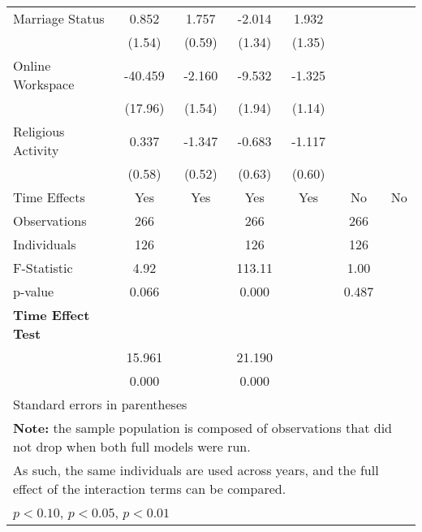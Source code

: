\begin{table}[htbp]
\begin{tabular}{l*{6}{c}}
\hspace{0.25cm} Marriage Status&0.852        &1.757\sym{**}&-2.014        &1.932        &             &             \\
                              &(1.54)        &(0.59)        &(1.34)        &(1.35)        &             &             \\
\hspace{0.25cm} Online Workspace&-40.459\sym{*} &-2.160        &-9.532\sym{**}&-1.325        &             &             \\
                              &(17.96)        &(1.54)        &(1.94)        &(1.14)        &             &             \\
\hspace{0.25cm} Religious Activity&0.337        &-1.347\sym{*} &-0.683        &-1.117\sym{^+}&             &             \\
                              &(0.58)        &(0.52)        &(0.63)        &(0.60)        &             &             \\
Time Effects                  &  Yes        &  Yes        &  Yes        &  Yes        &   No        &   No        \\
\midrule
Observations                  &  266        &             &  266        &             &  266        &             \\
Individuals                   &  126        &             &  126        &             &  126        &             \\
F-Statistic                   & 4.92        &             &113.11        &             & 1.00        &             \\
p-value                       &0.066        &             &0.000        &             &0.487        &             \\
\hline \textbf{Time Effect Test}&             &             &             &             &             &             \\
\texorpdfstring{F-value\textsubscript{time}}&15.961        &             &21.190        &             &             &             \\
\texorpdfstring{p-value\textsubscript{time}}&0.000        &             &0.000        &             &             &             \\
\bottomrule
\multicolumn{7}{l}{\footnotesize Standard errors in parentheses}\\
\multicolumn{7}{l}{\footnotesize \textbf{Note:} the sample population is composed of observations that did not drop when both full models were run.}\\
\multicolumn{7}{l}{\footnotesize As such, the same individuals are used across years, and the full effect of the interaction terms can be compared.}\\
\multicolumn{7}{l}{\footnotesize \sym{^+} \(p<0.10\), \sym{*} \(p<0.05\), \sym{**} \(p<0.01\)}\\
\end{tabular}
\end{table}
